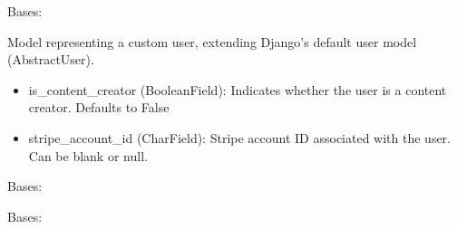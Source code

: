 \documentclass[letterpaper,10pt,english]{sphinxmanual}
\begin{document}
\begin{fulllineitems}
\label{\detokenize{modules/models:account.models.CustomUser}}
\pysigstartsignatures
{}
\pysigstopsignatures
\sphinxAtStartPar
Bases: 

\sphinxAtStartPar
Model representing a custom user, extending Django’s default user model (AbstractUser).
\begin{description}
\begin{itemize}
\item {} 
\sphinxAtStartPar
is\_content\_creator (BooleanField): Indicates whether the user is a content creator. Defaults to False

\item {} 
\sphinxAtStartPar
stripe\_account\_id (CharField): Stripe account ID associated with the user. Can be blank or null.

\end{itemize}

\end{description}

\begin{fulllineitems}
\label{\detokenize{modules/models:account.models.CustomUser.DoesNotExist}}
\pysigstartsignatures
{}
\pysigstopsignatures
\sphinxAtStartPar
Bases: 

\end{fulllineitems}


\begin{fulllineitems}
\label{\detokenize{modules/models:account.models.CustomUser.MultipleObjectsReturned}}
\pysigstartsignatures
{}
\pysigstopsignatures
\sphinxAtStartPar
Bases: 

\end{fulllineitems}


\end{fulllineitems}
\end{document}
